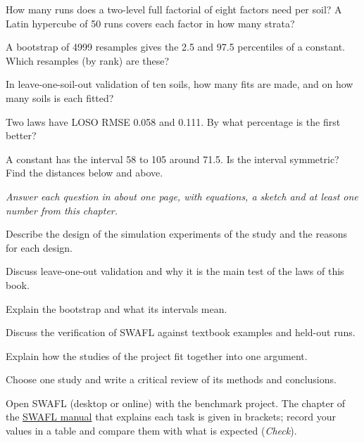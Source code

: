 \begin{exlist}
\item How many runs does a two-level full factorial of eight factors need per soil? A Latin hypercube of 50 runs covers each factor in how many strata?
\item A bootstrap of 4999 resamples gives the 2.5 and 97.5 percentiles of a constant. Which resamples (by rank) are these?
\item In leave-one-soil-out validation of ten soils, how many fits are made, and on how many soils is each fitted?
\item Two laws have LOSO RMSE 0.058 and 0.111. By what percentage is the first better?
\item A constant has the interval 58 to 105 around 71.5. Is the interval symmetric? Find the distances below and above.
\end{exlist}
{\small\itshape Answer each question in about one page, with equations, a sketch and at least one number from this chapter.}\par\vspace{3pt}
\begin{exlist}
\item Describe the design of the simulation experiments of the study and the reasons for each design.
\item Discuss leave-one-out validation and why it is the main test of the laws of this book.
\item Explain the bootstrap and what its intervals mean.
\item Discuss the verification of SWAFL against textbook examples and held-out runs.
\item Explain how the studies of the project fit together into one argument.
\item Choose one study and write a critical review of its methods and conclusions.
\end{exlist}
{\small Open SWAFL (desktop or online) with the benchmark project. The chapter of the \href{https://github.com/halilunaziru73-creator/Coupled-Water-Fluxes-Pore-Scale-Dynamics-Precision-Irrigation-Mulching-Feedback-Loops/raw/main/Software/v1.1.0/SWAFL_Desktop/docs/manual_v1.1.0/SWAFL_Manual_v1.1.0.pdf}{SWAFL manual} that explains each task is given in brackets; record your values in a table and compare them with what is expected (\emph{Check}).}\par\vspace{3pt}
